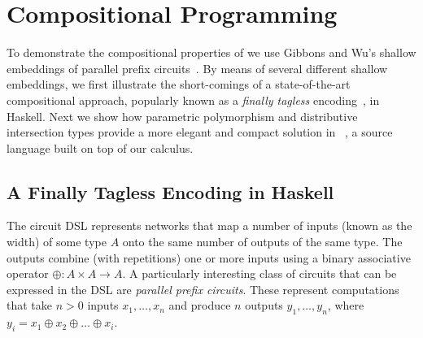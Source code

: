 


% 
% 
% 

\section{Compositional Programming}
\label{sec:overview}



To demonstrate the compositional properties of \fnamee we use Gibbons and Wu's shallow embeddings of
parallel prefix circuits~\cite{DBLP:conf/icfp/GibbonsW14}. By means of several different shallow
embeddings, we first illustrate the short-comings of a state-of-the-art
compositional approach, popularly known as a \emph{finally tagless}
encoding~\cite{CARETTE_2009}, in Haskell.
Next we show how parametric polymorphism and distributive intersection types provide
a more elegant and compact solution in \sedel~\cite{bi_et_al:LIPIcs:2018:9214}, a source language built on top of
our \fnamee calculus.


\subsection{A Finally Tagless Encoding in Haskell}

The circuit DSL represents networks that map a number of inputs (known as the width) of some type $A$ onto
the same number of outputs of the same type. The outputs combine (with repetitions) one or more
inputs using a binary associative operator $\oplus : A \times A \to A$.
A particularly interesting class of circuits that can be expressed in the DSL are
\emph{parallel prefix circuits}. These represent computations that take $n > 0$
inputs $x_1, \ldots, x_n$ and produce $n$ outputs $y_1, \ldots, y_n$, where
$y_i = x_1 \oplus x_2 \oplus \ldots \oplus x_i$.

